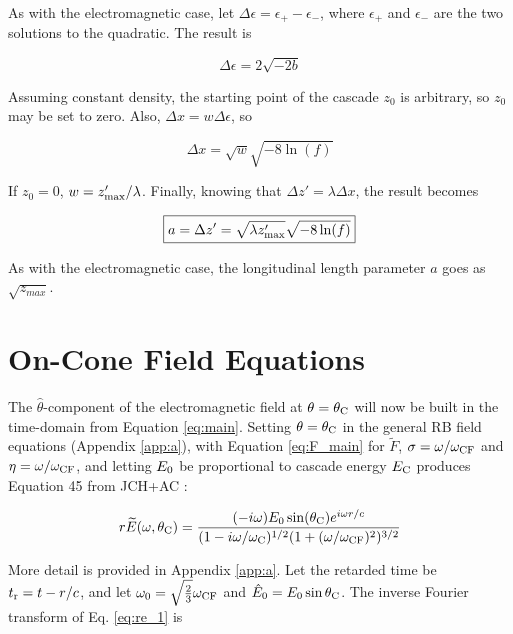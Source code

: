 \documentclass[amsmath,amssymb,aps,prd,10pt,twocolumn]{revtex4}
\begin{document}
As with the electromagnetic case, let $\Delta \epsilon = \epsilon_{+} - \epsilon_{-}$, where $\epsilon_{+}$ and $\epsilon_{-}$ are the two solutions to the quadratic.  The result is

\begin{equation}
\Delta \epsilon = 2\sqrt{-2b}
\end{equation}

Assuming constant density, the starting point of the cascade $z_0$ is arbitrary, so $z_0$ may be set to zero.  Also, $\Delta x = w\Delta \epsilon$, so

\begin{equation}
\Delta x = \sqrt{w} \sqrt{-8 \ln(f)}
\end{equation}

If $z_0 = 0$, $w = z'_{\rm max}/\lambda$.  Finally, knowing that $\Delta z' = \lambda \Delta x$, the result becomes

\begin{equation}
\boxed{
a = \Delta z' = \sqrt{\lambda z'_{\rm max}} \sqrt{-8 \ln(f)}
} \label{eq:main_2}
\end{equation}

As with the electromagnetic case, the longitudinal length parameter $a$ goes as $\sqrt{z_{max}}$.

\section{On-Cone Field Equations}
\label{sec:onc}

The $\hat{\theta}$-component of the electromagnetic field at $\theta = \theta_{\rm C}$ will now be built in the time-domain from Equation \ref{eq:main}.  Setting $\theta = \theta_{\rm C}$ in the general RB field equations (Appendix \ref{app:a}), with Equation \ref{eq:F_main} for $\widetilde{F}$, $\sigma = \omega/\omega_{\rm CF}$ and $\eta = \omega/\omega_{\rm CF}$, and letting $E_{\rm 0}$ be proportional to cascade energy $E_{\rm C}$ produces Equation 45 from JCH+AC \cite{10.1016/j.astropartphys.2017.03.008}:

\begin{equation}
r\widetilde{E}(\omega,\theta_{\rm C}) = \frac{(-i\omega) E_0 \sin(\theta_{\rm C}) e^{i\omega r/c}}{(1-i \omega/\omega_{\rm C})^{1/2} (1+(\omega/\omega_{\rm CF})^2)^{3/2}} \label{eq:re_1}
\end{equation}

More detail is provided in Appendix \ref{app:a}. Let the retarded time be $t_{\rm r} = t - r/c$, and let $\omega_0 = \sqrt{\frac{2}{3	}}\omega_{\rm CF}$ and $\hat{E}_{\rm 0} = E_{\rm 0} \sin\theta_{\rm C}$.  The inverse Fourier transform of Eq. \ref{eq:re_1} is
\end{document}
